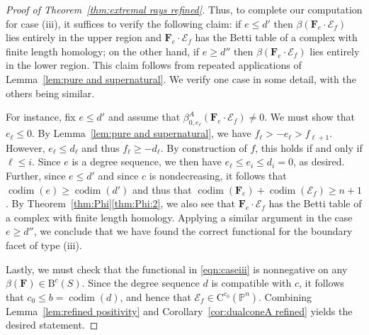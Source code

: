 \documentclass[12pt]{amsart}
\theoremstyle{definition}
\theoremstyle{remark}
\newcommand{\codim}{\operatorname{codim}}
\newcommand{\PP}{\mathbb{P}}
\newcommand{\cc}{c}
\newcommand{\cE}{\mathcal{E}}
\newcommand{\FF}{\mathbf{F}}
\newcommand{\CQ}{\mathrm{C}}
\newcommand{\BBQ}{\mathrm{B}}
\begin{document}
\begin{proof}[Proof of Theorem~\ref{thm:extremal rays refined}]
Thus, to complete our computation for case (iii), it suffices to verify the following claim: if $e\leq d'$ then $\beta(\FF_e\cdot \cE_f)$ lies entirely in the upper region and $\FF_e\cdot \cE_f$ has the Betti table of a complex with finite length homology; on the other hand, if $e\geq d''$ then $\beta(\FF_e\cdot \cE_f)$ lies entirely in the lower region.  This claim follows from repeated applications of Lemma~\ref{lem:pure and supernatural}.  We verify one case in some detail, with the others being similar.  

For instance, fix $e\leq d'$ and assume that $\beta_{0,e_\ell}^A(\FF_e\cdot \cE_f)\ne 0$.  We must show that $e_{\ell}\leq 0$.  By Lemma~\ref{lem:pure and supernatural}, we have
$
f_{\ell}>-e_{\ell}>f_{\ell+1}.
$
However, $e_{\ell}\leq d_{\ell}$ and thus $f_{\ell}\geq -d_{\ell}$.  By construction of $f$, this holds if and only if $\ell \leq i$.  Since $e$ is a degree sequence, we then have $e_{\ell}\leq e_i\leq d_i=0$, as desired.  Further, since $e\leq d'$ and since $\cc$ is nondecreasing, it follows that $\codim(e)\geq \codim(d')$ and thus that $\codim(\FF_e)+\codim(\cE_f)\geq n+1$.  By Theorem~\ref{thm:Phi}\eqref{thm:Phi:2}, we also see that $\FF_e\cdot \cE_f$ has the Betti table of a complex with finite length homology.  Applying a similar argument in the case $e\geq d''$, we conclude that we have found the correct functional for the boundary facet of type (iii).

Lastly, we must check that the functional in \eqref{eqn:caseiii}  is nonnegative on any $\beta(\FF)\in \BBQ^{\cc}(S)$.  Since the degree sequence $d$ is compatible with $\cc$, it follows that $c_0\leq b=\codim(d)$, and hence that $\cE_f\in \CQ^{c_0}(\PP^n)$.  Combining Lemma~\ref{lem:refined positivity} and Corollary~\ref{cor:dualconeA refined} yields the desired statement.



\end{proof}
\end{document}
